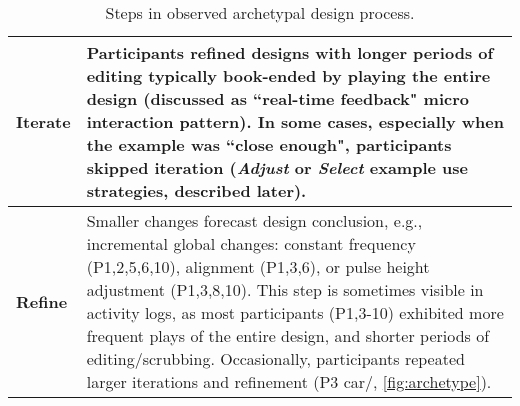 \begin{table*}[]
\begin{tabular}{p{0.4in}p{6.5in}}
    	    \textbf{Iterate} & 
                Participants refined designs with longer periods of editing typically book-ended by playing the entire design (discussed as ``real-time feedback"  micro interaction pattern).
            	In some cases, especially when the example was ``close enough", participants skipped iteration (\emph{Adjust} or \emph{Select} example use strategies, described later).
             \\
    	    \midrule
    	    
    	    \textbf{Refine} & 
                Smaller changes forecast design conclusion, e.g.,
            	incremental global changes: constant frequency (P1,2,5,6,10), alignment (P1,3,6), or pulse height adjustment (P1,3,8,10).
            	This step is sometimes visible in activity logs, as most participants (P1,3-10) exhibited more frequent plays of the entire design, and shorter periods of editing/scrubbing.
            	Occasionally, participants repeated larger iterations and refinement (P3 car/\hi, \autoref{fig:archetype}).
             \\
            \end{tabular}
            \caption{Steps in observed archetypal design process.
            }
            \label{tab:archetypal:process}
        \end{table*}
        
        
%
%
